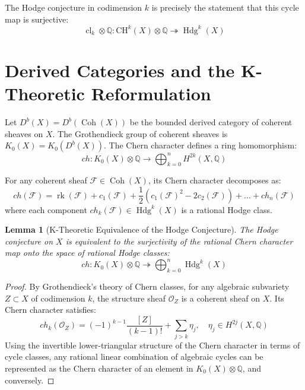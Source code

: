 \documentclass[11pt,a4paper]{article}
\newtheorem{lemma}[theorem]{Lemma}
\theoremstyle{definition}
\begin{document}
The Hodge conjecture in codimension $k$ is precisely the statement that this cycle map is surjective:
\begin{equation}
\operatorname{cl}_k \otimes \mathbb{Q} : \mathrm{CH}^k(X) \otimes \mathbb{Q} \twoheadrightarrow \operatorname{Hdg}^k(X)
\end{equation}

\section{Derived Categories and the K-Theoretic Reformulation}
Let $D^b(X) = D^b(\operatorname{Coh}(X))$ be the bounded derived category of coherent sheaves on $X$. The Grothendieck group of coherent sheaves is $K_0(X) = K_0(D^b(X))$.
The Chern character defines a ring homomorphism:
\begin{equation}
ch : K_0(X) \otimes \mathbb{Q} \longrightarrow \bigoplus_{k=0}^n H^{2k}(X, \mathbb{Q})
\end{equation}

For any coherent sheaf $\mathcal{F} \in \operatorname{Coh}(X)$, its Chern character decomposes as:
\begin{equation}
ch(\mathcal{F}) = \operatorname{rk}(\mathcal{F}) + c_1(\mathcal{F}) + \frac{1}{2}\left( c_1(\mathcal{F})^2 - 2c_2(\mathcal{F}) \right) + \dots + ch_n(\mathcal{F})
\end{equation}
where each component $ch_k(\mathcal{F}) \in \operatorname{Hdg}^k(X)$ is a rational Hodge class.

\begin{lemma}[K-Theoretic Equivalence of the Hodge Conjecture]
The Hodge conjecture on $X$ is equivalent to the surjectivity of the rational Chern character map onto the space of rational Hodge classes:
\begin{equation}
ch : K_0(X) \otimes \mathbb{Q} \twoheadrightarrow \bigoplus_{k=0}^n \operatorname{Hdg}^k(X)
\end{equation}
\end{lemma}
\begin{proof}
By Grothendieck's theory of Chern classes, for any algebraic subvariety $Z \subset X$ of codimension $k$, the structure sheaf $\mathcal{O}_Z$ is a coherent sheaf on $X$. Its Chern character satisfies:
\begin{equation}
ch_k(\mathcal{O}_Z) = (-1)^{k-1} \frac{[Z]}{(k-1)!} + \sum_{j > k} \eta_j, \quad \eta_j \in H^{2j}(X, \mathbb{Q})
\end{equation}
Using the invertible lower-triangular structure of the Chern character in terms of cycle classes, any rational linear combination of algebraic cycles can be represented as the Chern character of an element in $K_0(X) \otimes \mathbb{Q}$, and conversely.
\end{proof}
\end{document}
